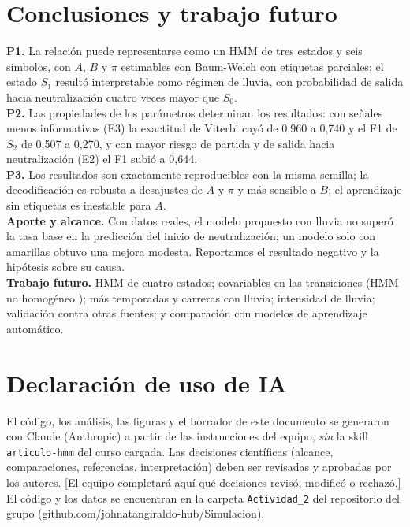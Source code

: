 \documentclass[11pt,letterpaper]{article}
\newcommand{\pend}[1]{\textcolor{red!70!black}{[#1]}}
\begin{document}
\section{Conclusiones y trabajo futuro}
\textbf{P1.} La relación puede representarse como un HMM de tres estados y seis símbolos, con $A$, $B$ y $\pi$ estimables con Baum-Welch con etiquetas parciales; el estado $S_1$ resultó interpretable como régimen de lluvia, con probabilidad de salida hacia neutralización cuatro veces mayor que $S_0$.\\
\textbf{P2.} Las propiedades de los parámetros determinan los resultados: con señales menos informativas (E3) la exactitud de Viterbi cayó de 0,960 a 0,740 y el F1 de $S_2$ de 0,507 a 0,270, y con mayor riesgo de partida y de salida hacia neutralización (E2) el F1 subió a 0,644.\\
\textbf{P3.} Los resultados son exactamente reproducibles con la misma semilla; la decodificación es robusta a desajustes de $A$ y $\pi$ y más sensible a $B$; el aprendizaje sin etiquetas es inestable para $A$.\\
\textbf{Aporte y alcance.} Con datos reales, el modelo propuesto con lluvia no superó la tasa base en la predicción del inicio de neutralización; un modelo solo con amarillas obtuvo una mejora modesta. Reportamos el resultado negativo y la hipótesis sobre su causa.\\
\textbf{Trabajo futuro.} HMM de cuatro estados; covariables en las transiciones (HMM no homogéneo \cite{r2}); más temporadas y carreras con lluvia; intensidad de lluvia; validación contra otras fuentes; y comparación con modelos de aprendizaje automático.

\section*{Declaración de uso de IA}
El código, los análisis, las figuras y el borrador de este documento se generaron con Claude (Anthropic) a partir de las instrucciones del equipo, \emph{sin} la skill \texttt{articulo-hmm} del curso cargada. Las decisiones científicas (alcance, comparaciones, referencias, interpretación) deben ser revisadas y aprobadas por los autores. \pend{El equipo completará aquí qué decisiones revisó, modificó o rechazó.} El código y los datos se encuentran en la carpeta \texttt{Actividad\_2} del repositorio del grupo (github.com/johnatangiraldo-hub/Simulacion).
\end{document}
